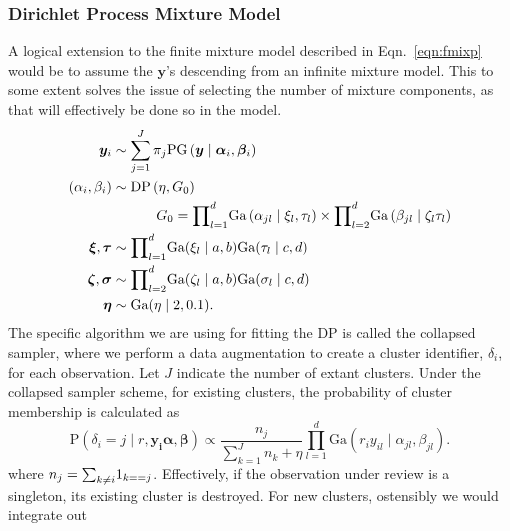 \subsubsection{Dirichlet Process Mixture Model}
A logical extension to the finite mixture model described in Eqn.~\ref{eqn:fmixp} would be to assume the
  $\bm{ y}$'s descending from an infinite mixture model.  This to some extent solves the issue of
  selecting the number of mixture components, as that will effectively be done so in the model.
  \begin{equation}
    \label{eqn:infmixp}
    \begin{aligned}
      \bm{ y}_i &\sim \sum_{j = 1}^J\pi_j\text{PG}\left(\bm{ y}\mid \bm{ \alpha}_i, \bm{ \beta}_i\right)\\
      (\alpha_i,\beta_i) &\sim \text{DP}\left(\eta, G_0\right)\\
      &~\hspace{1cm}G_0 = {\displaystyle\prod}_{l = 1}^d\text{Ga}\left(\alpha_{jl}\mid\xi_{l},\tau_{l}\right)
                    \times{\displaystyle\prod}_{l=2}^d\text{Ga}\left(\beta_{jl}\mid\zeta_{l}\tau_{l}\right)\\
      \bm{ \xi},\bm{ \tau} &\sim {\small \prod}_{l = 1}^d \text{Ga}(\xi_l\mid a,b)\text{Ga}(\tau_l\mid c,d)\\
      \bm{ \zeta},\bm{\sigma} &\sim {\displaystyle\prod}_{l = 2}^d\text{Ga}(\zeta_l \mid a,b)\text{Ga}(\sigma_l\mid c,d)\\
      \bm{ \eta} &\sim \text{Ga}(\eta \mid 2, 0.1).
    \end{aligned}
  \end{equation}
  The specific algorithm we are using for fitting the DP is called the collapsed sampler\findcite,
  where we perform a data augmentation to create a cluster identifier, $\delta_i$, for each observation.
  Let $J$ indicate the number of extant clusters.  Under the collapsed sampler scheme, for existing
  clusters, the probability of cluster membership is calculated as
  \begin{equation}
    \label{eqn:dpdelta}
    \text{P}\left(\delta_i = j\mid r, \bm{ y_i} \bm{ \alpha}, \bm{ \beta}\right) \propto
        \frac{n_j}{\sum_{k = 1}^{J} n_k + \eta}
        {\displaystyle\prod}_{l = 1}^d\text{Ga}\left(r_iy_{il}\mid\alpha_{jl},\beta_{jl}\right).
  \end{equation}
  where $n_j = {\small\sum}_{k\neq i}1_{k == j}$.  Effectively, if the observation under review is a
  singleton, its existing cluster is destroyed.  For new clusters, ostensibly we would integrate out
